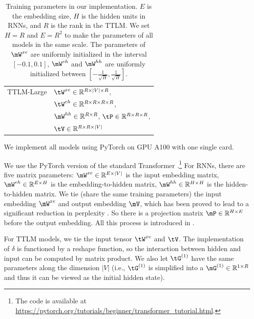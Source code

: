 \begin{table}[ht]
\begin{tabular}{ll}
        \hline
        TTLM-Large & $\tW^{xe}\in\mathbb{R}^{R\times |V|\times R}$, \\ & $\tW^{eh}\in\mathbb{R}^{R\times R\times R\times R}$, \\
        & $\mW^{hh}\in\mathbb{R}^{R\times R}$, $\tP\in\mathbb{R}^{R\times R\times R}$, \\
        &  $\tV\in\mathbb{R}^{R\times R\times |V|}$\\
    \bottomrule
    \end{tabular}
    \caption{Training parameters in our implementation. $E$ is the embedding size, $H$ is the hidden units in RNNs, and $R$ is the rank in the TTLM.  We set $H=R$ and $E=R^2$ to make the parameters of all models in the same scale. The parameters of $\mW^{xe}$ are uniformly initialized in the interval $[-0.1,0.1]$, $\mW^{eh}$ and $\mW^{hh}$ are uniformly initialized between $[-\frac{1}{\sqrt{H}}, \frac{1}{\sqrt{H}}]$.}
    \label{tab:my_label}
\end{table}

We implement all models using PyTorch on GPU A100 with one single card. 

We use the PyTorch version of the standard Transformer \citep{vaswani2017attention}.\footnote{The code is available at \url{https://pytorch.org/tutorials/beginner/transformer_tutorial.html}.} For RNNs, there are five matrix parameters: $\mW^{xe}\in \mathbb{R}^{E\times |V|}$ is the input embedding matrix, $\mW^{eh}\in
\mathbb{R}^{E\times H}$ is the embedding-to-hidden matrix, $\mW^{hh}\in \mathbb{R}^{H\times H}$ is the hidden-to-hidden matrix. We tie (share the same training parameters) the input embedding  $\mW^{xe}$ and output embedding $\mV$, which has been proved to lead to a significant reduction in perplexity \citep{press2016using}. So there is a projection matrix $\mP\in\mathbb{R}^{H\times E}$ before the output embedding. All this process is introduced in  \citep{press2016using}. 

For TTLM models, we tie the input tensor $\tW^{xe}$ and $\tV$. The implementation of $\delta$ is functioned by a reshape function, so the interaction between hidden and input can be computed by matrix product. We also let $\tG^{(1)}$ have the same parameters along the dimension $|V|$ (i.e., $\tG^{(1)}$ is simplified into a  $\mG^{(1)}\in\mathbb{R}^{1\times R}$ and thus it can be viewed as the initial hidden state).  



